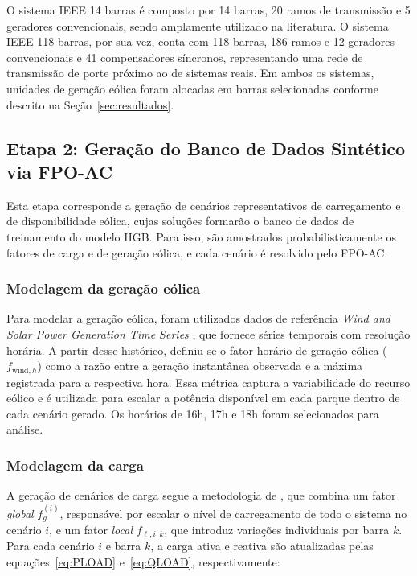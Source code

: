 \documentclass[conference]{IEEEtran}
\begin{document}
O sistema IEEE 14 barras é composto por 14 barras, 20 ramos de transmissão
e 5 geradores convencionais, sendo amplamente utilizado na literatura. O sistema IEEE 118 barras, por sua vez, conta com 118 barras, 186 ramos e 12 geradores convencionais e 41 compensadores síncronos, representando uma rede de transmissão de porte próximo ao de sistemas reais. Em ambos os sistemas, unidades de geração eólica foram alocadas em barras selecionadas conforme descrito na Seção~\ref{sec:resultados}.

\subsection{Etapa 2: Geração do Banco de Dados Sintético via FPO-AC}

Esta etapa corresponde a geração de cenários representativos de
carregamento e de disponibilidade eólica, cujas soluções formarão
o banco de dados de treinamento do modelo HGB. Para isso, são amostrados
probabilisticamente os fatores de carga e de geração eólica, e cada cenário é resolvido pelo FPO-AC.

\subsubsection{Modelagem da geração eólica}

Para modelar a geração eólica, foram utilizados dados de referência
\textit{Wind and Solar Power Generation Time Series}
\cite{afroz_wind_solar_timeseries}, que fornece séries temporais com
resolução horária. A partir desse histórico, definiu-se o fator horário de geração eólica ($f_{\text{wind},h}$) como a razão entre a geração instantânea observada e a máxima registrada para a respectiva hora. Essa métrica captura a variabilidade do recurso eólico e é utilizada para escalar a potência disponível em cada parque dentro de cada cenário gerado. Os horários de 16h, 17h e 18h foram selecionados para análise.

\subsubsection{Modelagem da carga}

A geração de cenários de carga segue a metodologia de
\cite{Ferreira2021_OPF_SecurityRegion}, que combina um fator
\emph{global} $f_g^{(i)}$, responsável por escalar o nível de carregamento
de todo o sistema no cenário $i$, e um fator \emph{local} $f_{\ell,i,k}$,
que introduz variações individuais por barra $k$. Para cada cenário $i$
e barra $k$, a carga ativa e reativa são atualizadas pelas
equações~\eqref{eq:PLOAD} e~\eqref{eq:QLOAD}, respectivamente:
\end{document}
